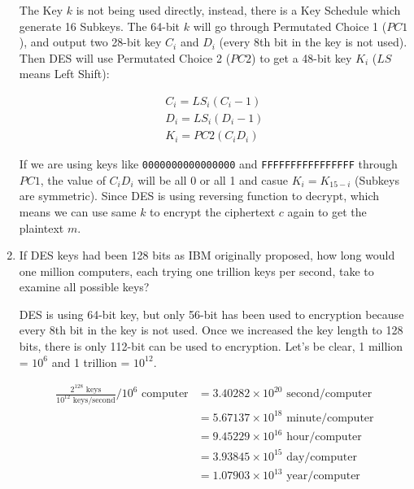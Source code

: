 \documentclass[11pt]{article}
\begin{document}
\begin{enumerate}
The Key $k$ is not being used directly, instead, there is a Key Schedule which generate 16 Subkeys. The 64-bit $k$ will go through Permutated Choice 1 ($PC1$), and output two 28-bit key $C_{i}$ and $D_{i}$ (every 8th bit in the key is not used). Then DES will use Permutated Choice 2 ($PC2$) to get a 48-bit key $K_{i}$ ($LS$ means Left Shift):

\begin{align*}
  C_{i}=LS_{i}(C_{i}-1) \\
  D_{i}=LS_{i}(D_{i}-1) \\
  K_{i}=PC2(C_{i}D_{i})
\end{align*}

If we are using keys like {\tt 0000000000000000} and {\tt FFFFFFFFFFFFFFFF} through $PC1$, the value of $C_{i}D_{i}$ will be all 0 or all 1 and casue $K_{i}=K_{15-i}$ (Subkeys are symmetric). Since DES is using reversing function to decrypt, which means we can use same $k$ to encrypt the ciphertext $c$ again to get the plaintext $m$.

\item If DES keys had been 128 bits as IBM originally proposed, how long would one million computers, each trying one trillion keys per second, take to examine all possible keys?

DES is using 64-bit key, but only 56-bit has been used to encryption because every 8th bit in the key is not used. Once we increased the key length to 128 bits, there is only 112-bit can be used to encryption. Let's be clear, 1 million = $10^{6}$ and 1 trillion = $10^{12}$.

\begin{align*}
  \frac{2^{128}\text{ keys}}{10^{12}\text{ keys/second}}/10^{6}\text{ computer}&=3.40282 \times 10^{20} \text{ second/computer} \\
  &=5.67137 \times 10^{18} \text{ minute/computer} \\
  &=9.45229 \times 10^{16} \text{ hour/computer} \\
  &=3.93845 \times 10^{15} \text{ day/computer} \\
  &=1.07903 \times 10^{13} \text{ year/computer} \\
\end{align*}

\end{enumerate}
\end{document}
